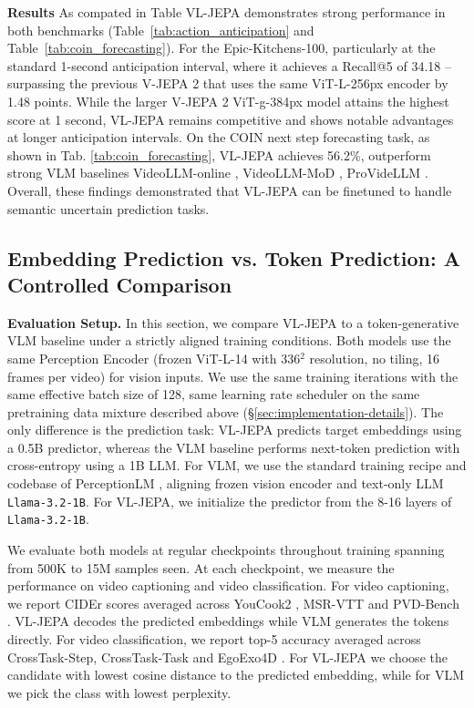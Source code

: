 \textbf{Results} As compated in Table VL-JEPA demonstrates strong performance in both benchmarks (Table~\ref{tab:action_anticipation} and Table~\ref{tab:coin_forecasting}). For the Epic-Kitchens-100, particularly at the standard 1-second anticipation interval, where it achieves a Recall@5 of 34.18 -- surpassing the previous V-JEPA 2 that uses the same ViT-L-256px encoder by 1.48 points. While the larger V-JEPA 2 ViT-g-384px model attains the highest score at 1 second, VL-JEPA remains competitive and shows notable advantages at longer anticipation intervals. 
On the COIN next step forecasting task, as shown in Tab. \ref{tab:coin_forecasting}, VL-JEPA achieves 56.2\%, outperform strong VLM baselines VideoLLM-online \citep{chen2024videollm}, VideoLLM-MoD \citep{wu2024videollm}, ProVideLLM \citep{chatterjee2025memory}. Overall, these findings demonstrated that VL-JEPA can be finetuned to handle semantic uncertain prediction tasks.


\subsection{Embedding Prediction vs. Token Prediction: A Controlled Comparison}
\label{sec:exp.embbeddings_vs_tokens}

\textbf{Evaluation Setup.} In this section, we compare VL-JEPA to a token-generative VLM baseline under a strictly aligned training conditions. Both models use the same Perception Encoder \citep{bolya2025perception} (frozen ViT-L-14 with 336$^2$ resolution, no tiling, 16 frames per video) for vision inputs. We use the same training iterations with the same effective batch size of 128, same learning rate scheduler on the same pretraining data mixture described above (\S\ref{sec:implementation-details}). The only difference is the prediction task: VL-JEPA predicts target embeddings \citep{duquenne2023sonar} using a 0.5B predictor, whereas the VLM baseline performs next-token prediction with cross-entropy using a 1B LLM. For VLM, we use the standard training recipe and codebase of PerceptionLM \citep{cho2025perceptionlm}, aligning frozen vision encoder and text-only LLM \texttt{Llama-3.2-1B}. For VL-JEPA, we initialize the predictor from the 8-16 layers of \texttt{Llama-3.2-1B}.

We evaluate both models at regular checkpoints throughout training spanning from 500K to 15M samples seen. At each checkpoint, we measure the performance on video captioning and video classification. For video captioning, we report CIDEr scores averaged across YouCook2 \citep{zhou2018towards}, MSR-VTT \citep{xu2016msr} and PVD-Bench \citep{bolya2025perception}. VL-JEPA decodes the predicted embeddings while VLM generates the tokens directly. For video classification, we report top-5 accuracy averaged across CrossTask-Step, CrossTask-Task \citep{zhukov2019cross} and EgoExo4D \citep{grauman2024ego}. For VL-JEPA we choose the candidate with lowest cosine distance to the predicted embedding, while for VLM we pick the class with lowest perplexity.


